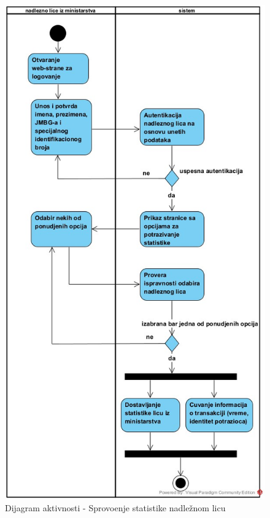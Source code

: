 \documentclass[titlepage]{article}
\begin{document}
\begin{figure}[H]
\includegraphics[scale=0.53]{Sprovodjenje_statistike}
\caption{Dijagram aktivnosti - Sprovo\dj{}enje statistike nadle\v{z}nom licu}
\end{figure}
\end{document}
